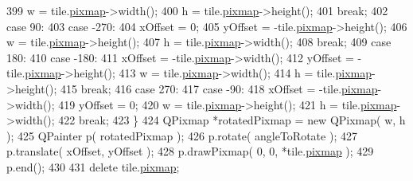 \begin{DoxyCode}
399                     w = tile.\hyperlink{classOkular_1_1TileNode_a6f1530e7484013655499145b83debc0d}{pixmap}->width();
400                     h = tile.\hyperlink{classOkular_1_1TileNode_a6f1530e7484013655499145b83debc0d}{pixmap}->height();
401                     \textcolor{keywordflow}{break};
402                 \textcolor{keywordflow}{case} 90:
403                 \textcolor{keywordflow}{case} -270:
404                     xOffset = 0;
405                     yOffset = -tile.\hyperlink{classOkular_1_1TileNode_a6f1530e7484013655499145b83debc0d}{pixmap}->height();
406                     w = tile.\hyperlink{classOkular_1_1TileNode_a6f1530e7484013655499145b83debc0d}{pixmap}->height();
407                     h = tile.\hyperlink{classOkular_1_1TileNode_a6f1530e7484013655499145b83debc0d}{pixmap}->width();
408                     \textcolor{keywordflow}{break};
409                 \textcolor{keywordflow}{case} 180:
410                 \textcolor{keywordflow}{case} -180:
411                     xOffset = -tile.\hyperlink{classOkular_1_1TileNode_a6f1530e7484013655499145b83debc0d}{pixmap}->width();
412                     yOffset = -tile.\hyperlink{classOkular_1_1TileNode_a6f1530e7484013655499145b83debc0d}{pixmap}->height();
413                     w = tile.\hyperlink{classOkular_1_1TileNode_a6f1530e7484013655499145b83debc0d}{pixmap}->width();
414                     h = tile.\hyperlink{classOkular_1_1TileNode_a6f1530e7484013655499145b83debc0d}{pixmap}->height();
415                     \textcolor{keywordflow}{break};
416                 \textcolor{keywordflow}{case} 270:
417                 \textcolor{keywordflow}{case} -90:
418                     xOffset = -tile.\hyperlink{classOkular_1_1TileNode_a6f1530e7484013655499145b83debc0d}{pixmap}->width();
419                     yOffset = 0;
420                     w = tile.\hyperlink{classOkular_1_1TileNode_a6f1530e7484013655499145b83debc0d}{pixmap}->height();
421                     h = tile.\hyperlink{classOkular_1_1TileNode_a6f1530e7484013655499145b83debc0d}{pixmap}->width();
422                     \textcolor{keywordflow}{break};
423             \}
424             QPixmap *rotatedPixmap = \textcolor{keyword}{new} QPixmap( w, h );
425             QPainter p( rotatedPixmap );
426             p.rotate( angleToRotate );
427             p.translate( xOffset, yOffset );
428             p.drawPixmap( 0, 0, *tile.\hyperlink{classOkular_1_1TileNode_a6f1530e7484013655499145b83debc0d}{pixmap} );
429             p.end();
430 
431             \textcolor{keyword}{delete} tile.\hyperlink{classOkular_1_1TileNode_a6f1530e7484013655499145b83debc0d}{pixmap};

\end{DoxyCode}

